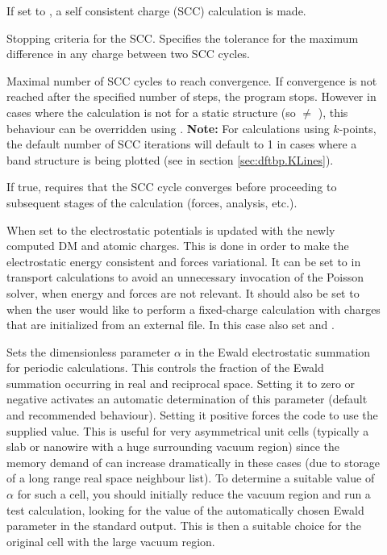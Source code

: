 \begin{description}
\item[] If set to , a self consistent charge (SCC)
  calculation is made.

\item[] Stopping criteria for the SCC.  Specifies the
  tolerance for the maximum difference in any charge between two SCC
  cycles.

\item[] Maximal number of SCC cycles to reach
  convergence. If convergence is not reached after the specified
  number of steps, the program stops. However in cases where the
  calculation is not for a static structure (so  $\neq$
  \cb), this behaviour can be overridden using
  . {\bf Note:} For calculations using
  $k$-points, the default number of SCC iterations will default to 1
  in cases where a band structure is being plotted (see 
  in section \ref{sec:dftbp.KLines}).

\item[] If true, requires that the SCC cycle converges
  before proceeding to subsequent stages of the calculation (forces, analysis,
  etc.).

\item[] When set to  the
  electrostatic potentials is updated with the newly computed DM and
  atomic charges. This is done in order to make the electrostatic
  energy consistent and forces variational.  It can be set to 
  in transport calculations to avoid an unnecessary invocation of the
  Poisson solver, when energy and forces are not relevant.  It should
  also be set to  when the user would like to perform a
  fixed-charge calculation with charges that are initialized from an
  external file. In this case also set  and
  .

\item[] Sets the dimensionless parameter $\alpha$
  in the Ewald electrostatic summation for periodic calculations. This
  controls the fraction of the Ewald summation occurring in real and
  reciprocal space. Setting it to zero or negative activates an
  automatic determination of this parameter (default and recommended
  behaviour). Setting it positive forces the code to use the supplied
  value. This is useful for very asymmetrical unit cells
  (typically a slab or nanowire with a huge surrounding vacuum region)
  since the memory demand of \dftbp{} can increase dramatically in
  these cases (due to storage of a long range real space neighbour
  list). To determine a suitable value of $\alpha$ for such a cell,
  you should initially reduce the vacuum region and run a test
  calculation, looking for the value of the automatically chosen Ewald
  parameter in the standard output. This is then a suitable choice for
  the original cell with the large vacuum region.


\end{description}
